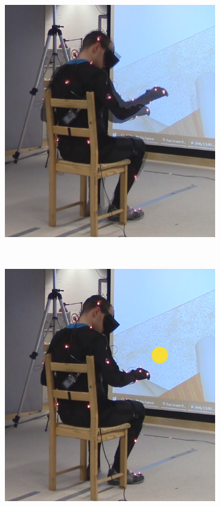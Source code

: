 \begin{figure}[h]
\begin{subfigure}[b]{.3\textwidth}
        \includegraphics[width=\textwidth]{Figures/handPositionTwice.png}
    \end{subfigure}
    ~
    \begin{subfigure}[b]{.3\textwidth}
        \includegraphics[width=\textwidth]{Figures/handPositionTarget.png}
    \end{subfigure}
        

\end{figure}
